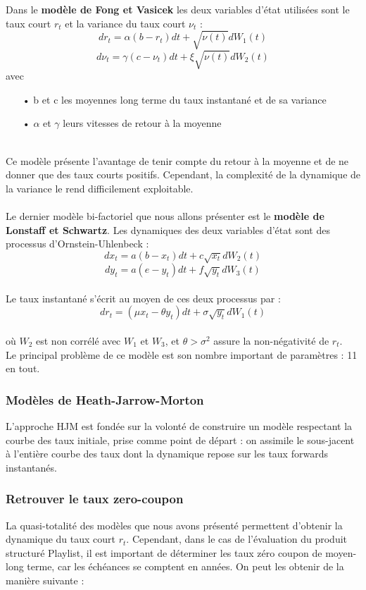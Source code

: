 \documentclass[french,12pt,a4paper]{article}
\begin{document}
Dans le \textbf{modèle de Fong et Vasicek} les deux variables d'état utilisées sont le taux court $r_{t}$ et la variance du taux court $\nu_{t}$ : \\
$$ dr_{t}=\alpha(b-r_{t})dt + \sqrt{\nu(t)}dW_{1}(t) $$
$$ d\nu_{t}=\gamma(c-\nu_{t})dt + \xi\sqrt{\nu(t)}dW_{2}(t) $$
avec
\begin{itemize}
\item[•] b et c les moyennes long terme du taux instantané et de sa variance
\item[•] $\alpha$ et $\gamma$ leurs vitesses de retour à la moyenne
\end{itemize}
\\
Ce modèle présente l'avantage de tenir compte du retour à la moyenne et de ne donner que des taux courts positifs.
Cependant, la complexité de la dynamique de la variance le rend difficilement exploitable.\\ \\


Le dernier modèle bi-factoriel que nous allons présenter est le \textbf{modèle de Lonstaff et Schwartz}. Les dynamiques des deux variables d'état sont des processus d'Ornstein-Uhlenbeck :
$$ dx_{t} = a(b-x_{t})dt + c\sqrt{x_{t}}dW_{2}(t) $$
$$ dy_{t} = a(e-y_{t})dt + f\sqrt{y_{t}}dW_{3}(t) $$ \\
Le taux instantané s'écrit au moyen de ces deux processus par : \\

$$ dr_{t} = (\mu x_{t} - \theta y_{t})dt + \sigma \sqrt{y_{t}}dW_{1}(t) $$ \\
où $W_{2}$ est non corrélé avec $W_{1}$ et $W_{3}$, et $\theta > \sigma^{2} $ assure la non-négativité de $r_{t}$.\\

Le principal problème de ce modèle est son nombre important de paramètres : 11 en tout.
 
\subsubsection{Modèles de Heath-Jarrow-Morton}
L'approche HJM est fondée sur la volonté de construire un modèle respectant la courbe des taux initiale, prise comme point de départ : on assimile le sous-jacent à l'entière courbe des taux dont la dynamique repose sur les taux forwards instantanés.

\subsubsection{Retrouver le taux zero-coupon}
La quasi-totalité des modèles que nous avons présenté permettent d'obtenir la dynamique du taux court $r_{t}$. Cependant, dans le cas de l'évaluation du produit structuré Playlist, il est important de déterminer les taux zéro coupon de moyen-long terme, car les échéances se comptent en années. On peut les obtenir de la manière suivante : \\
\end{document}

